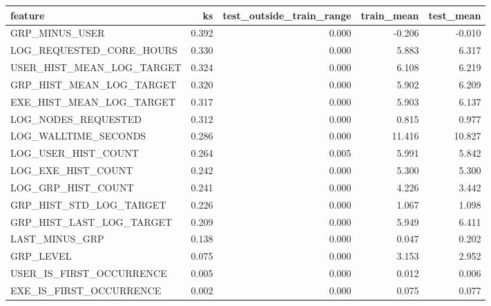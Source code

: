 \begin{tabular}{lrrrr}
\toprule
feature & ks & test_outside_train_range & train_mean & test_mean \\
\midrule
GRP_MINUS_USER & 0.392 & 0.000 & -0.206 & -0.010 \\
LOG_REQUESTED_CORE_HOURS & 0.330 & 0.000 & 5.883 & 6.317 \\
USER_HIST_MEAN_LOG_TARGET & 0.324 & 0.000 & 6.108 & 6.219 \\
GRP_HIST_MEAN_LOG_TARGET & 0.320 & 0.000 & 5.902 & 6.209 \\
EXE_HIST_MEAN_LOG_TARGET & 0.317 & 0.000 & 5.903 & 6.137 \\
LOG_NODES_REQUESTED & 0.312 & 0.000 & 0.815 & 0.977 \\
LOG_WALLTIME_SECONDS & 0.286 & 0.000 & 11.416 & 10.827 \\
LOG_USER_HIST_COUNT & 0.264 & 0.005 & 5.991 & 5.842 \\
LOG_EXE_HIST_COUNT & 0.242 & 0.000 & 5.300 & 5.300 \\
LOG_GRP_HIST_COUNT & 0.241 & 0.000 & 4.226 & 3.442 \\
GRP_HIST_STD_LOG_TARGET & 0.226 & 0.000 & 1.067 & 1.098 \\
GRP_HIST_LAST_LOG_TARGET & 0.209 & 0.000 & 5.949 & 6.411 \\
LAST_MINUS_GRP & 0.138 & 0.000 & 0.047 & 0.202 \\
GRP_LEVEL & 0.075 & 0.000 & 3.153 & 2.952 \\
USER_IS_FIRST_OCCURRENCE & 0.005 & 0.000 & 0.012 & 0.006 \\
EXE_IS_FIRST_OCCURRENCE & 0.002 & 0.000 & 0.075 & 0.077 \\
\bottomrule
\end{tabular}
